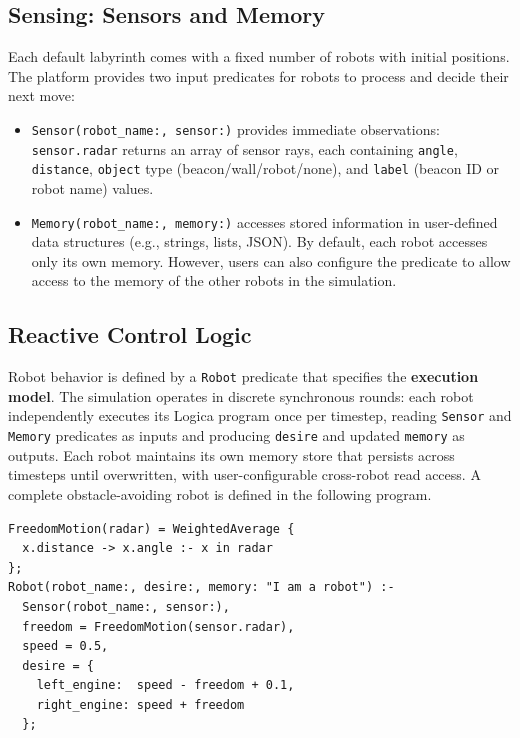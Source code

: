 \documentclass[sigconf]{acmart}
\begin{document}
\subsection{Sensing: Sensors and Memory}
Each default labyrinth comes with a fixed number of robots with initial positions. The platform provides two input predicates for robots to process and decide their next move:

\begin{itemize}
  \item \texttt{Sensor(robot\_name:, sensor:)} provides immediate observations: \texttt{sensor.radar} returns an array of sensor rays, each containing \texttt{angle}, \texttt{distance}, \texttt{object} type (beacon/wall/robot/none), and \texttt{label} (beacon ID or robot name) values. 

 \item \texttt{Memory(robot\_name:, memory:)} accesses stored information in user-defined data structures (e.g., strings, lists, JSON). By default, each robot accesses only its own memory. However, users can also configure the predicate to allow access to the memory of the other robots in the simulation.
\end{itemize}

\vspace{-6pt}
\subsection{Reactive Control Logic}

Robot behavior is defined by a \texttt{Robot} predicate that specifies the \textbf{execution model}. The simulation operates in discrete synchronous rounds: each robot independently executes its Logica program once per timestep, reading \texttt{Sensor} and \texttt{Memory} predicates as inputs and producing \texttt{desire} and updated \texttt{memory} as outputs. Each robot maintains its own memory store that persists across timesteps until overwritten, with user-configurable cross-robot read access. A complete obstacle-avoiding robot is defined in the following program.

\begin{lstlisting}[language=LOGICA2]
FreedomMotion(radar) = WeightedAverage {
  x.distance -> x.angle :- x in radar
};
Robot(robot_name:, desire:, memory: "I am a robot") :-
  Sensor(robot_name:, sensor:),
  freedom = FreedomMotion(sensor.radar),
  speed = 0.5,
  desire = {
    left_engine:  speed - freedom + 0.1,
    right_engine: speed + freedom
  };
\end{lstlisting}
\end{document}
